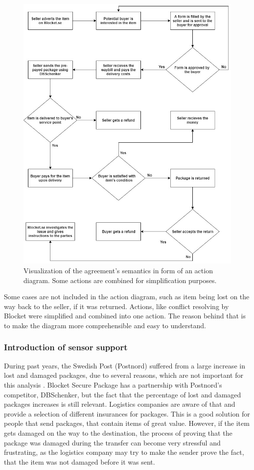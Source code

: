 \begin{figure}[H]
\centering
\includegraphics[scale=0.55]{images/actiondiagram.jpg}
\caption{Visualization of the agreement's semantics in form of an action diagram. Some actions are combined for simplification purposes.}
\label{fig:agreementaction}
\end{figure}

Some cases are not included in the action diagram, such as item being lost on the way back to the seller, if it was returned. Actions, like conflict resolving by Blocket were simplified and combined into one action. The reason behind that is to make the diagram more comprehensible and easy to understand.

\subsubsection{Introduction of sensor support} \label{section:additional functionality}
During past years, the Swedish Post (Postnord) suffered from a large increase in lost and damaged packages, due to several reasons, which are not important for this analysis \citep{poststats}. Blocket Secure Package has a partnership with Postnord's competitor, DBSchenker, but the fact that the percentage of lost and damaged packages increases is still relevant. Logistics companies are aware of that and provide a selection of different insurances for packages. This is a good solution for people that send packages, that contain items of great value. However, if the item gets damaged on the way to the destination, the process of proving that the package was damaged during the transfer can become very stressful and frustrating, as the logistics company may try to make the sender prove the fact, that the item was not damaged before it was sent.

